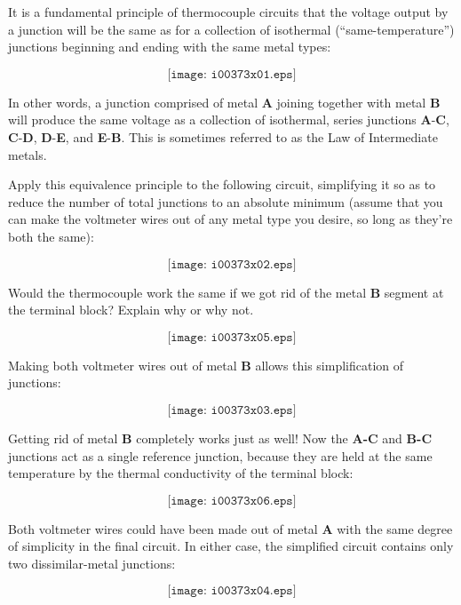 

It is a fundamental principle of thermocouple circuits that the voltage output by a junction will be the same as for a collection of isothermal (``same-temperature'') junctions beginning and ending with the same metal types:

$$\texttt{[image: i00373x01.eps]}$$

In other words, a junction comprised of metal {\bf A} joining together with metal {\bf B} will produce the same voltage as a collection of isothermal, series junctions {\bf A}-{\bf C}, {\bf C}-{\bf D}, {\bf D}-{\bf E}, and {\bf E}-{\bf B}.  This is sometimes referred to as the Law of Intermediate metals.  

Apply this equivalence principle to the following circuit, simplifying it so as to reduce the number of total junctions to an absolute minimum (assume that you can make the voltmeter wires out of any metal type you desire, so long as they're both the same):

$$\texttt{[image: i00373x02.eps]}$$

Would the thermocouple work the same if we got rid of the metal {\bf B} segment at the terminal block?  Explain why or why not.

$$\texttt{[image: i00373x05.eps]}$$







Making both voltmeter wires out of metal {\bf B} allows this simplification of junctions:

$$\texttt{[image: i00373x03.eps]}$$

Getting rid of metal {\bf B} completely works just as well!  Now the {\bf A-C} and {\bf B-C} junctions act as a single reference junction, because they are held at the same temperature by the thermal conductivity of the terminal block:

$$\texttt{[image: i00373x06.eps]}$$







Both voltmeter wires could have been made out of metal {\bf A} with the same degree of simplicity in the final circuit.  In either case, the simplified circuit contains only two dissimilar-metal junctions:

$$\texttt{[image: i00373x04.eps]}$$




